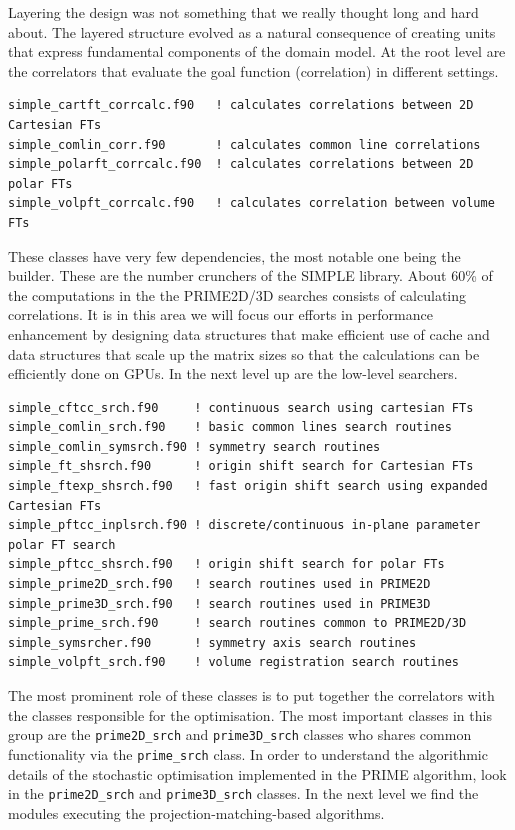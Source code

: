 \documentclass[a4paper,11pt]{article}
\begin{document}
Layering the design was not something that we really thought long and hard about. The layered structure evolved as a natural consequence of creating units that express fundamental components of the domain model. At the root level are the correlators that evaluate the goal function (correlation) in different settings.
\begin{verbatim}
simple_cartft_corrcalc.f90   ! calculates correlations between 2D Cartesian FTs
simple_comlin_corr.f90       ! calculates common line correlations
simple_polarft_corrcalc.f90  ! calculates correlations between 2D polar FTs 
simple_volpft_corrcalc.f90   ! calculates correlation between volume FTs
\end{verbatim}
These classes have very few dependencies, the most notable one being the builder. These are the number crunchers of the SIMPLE library. About 60\% of the computations in the the PRIME2D/3D searches consists of calculating correlations. It is in this area we will focus our efforts in performance enhancement by designing data structures that make efficient use of cache and data structures that scale up the matrix sizes so that the calculations can be efficiently done on GPUs. In the next level up are the low-level searchers.
\begin{verbatim}
simple_cftcc_srch.f90     ! continuous search using cartesian FTs
simple_comlin_srch.f90    ! basic common lines search routines
simple_comlin_symsrch.f90 ! symmetry search routines
simple_ft_shsrch.f90      ! origin shift search for Cartesian FTs
simple_ftexp_shsrch.f90   ! fast origin shift search using expanded Cartesian FTs
simple_pftcc_inplsrch.f90 ! discrete/continuous in-plane parameter polar FT search
simple_pftcc_shsrch.f90   ! origin shift search for polar FTs
simple_prime2D_srch.f90   ! search routines used in PRIME2D
simple_prime3D_srch.f90   ! search routines used in PRIME3D
simple_prime_srch.f90     ! search routines common to PRIME2D/3D
simple_symsrcher.f90      ! symmetry axis search routines
simple_volpft_srch.f90    ! volume registration search routines
\end{verbatim}
The most prominent role of these classes is to put together the correlators with the classes responsible for the optimisation. The most important classes in this group are the \texttt{prime2D\_srch} and \texttt{prime3D\_srch} classes who shares common functionality via the \texttt{prime\_srch} class. In order to understand the algorithmic details of the stochastic optimisation implemented in the PRIME algorithm, look in the \texttt{prime2D\_srch} and \texttt{prime3D\_srch} classes. In the next level we find the modules executing the projection-matching-based algorithms.
\end{document}
